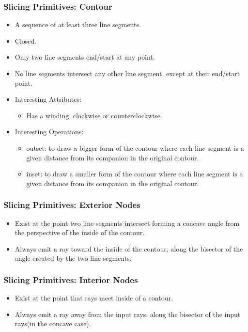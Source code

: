 \documentclass[hyperref={pdfpagemode=FullScreen},aspectratio=169]{beamer}
\begin{document}
\begin{frame}
  \frametitle{Slicing Primitives: Contour}
  \begin{itemize}
  \item A sequence of at least three line segments.
  \item Closed.
  \item Only two line segments end/start at any point.
  \item No line segments intersect any other line segment, except at their end/start point.
  \item Interesting Attributes:
    \begin {itemize}
      \item Has a winding, clockwise or counterclockwise.
    \end{itemize}
  \item Interesting Operations:
    \begin {itemize}
    \item outset: to draw a bigger form of the contour where each line segment is a given distance from its companion in the original contour.
    \item inset: to draw a smaller form of the contour where each line segment is a given distance from its companion in the original contour.
    \end{itemize}
  \end{itemize}
\end{frame}

\begin{frame}
  \frametitle{Slicing Primitives: Exterior Nodes}
  \begin{itemize}
  \item Exist at the point two line segments intersect forming a concave angle from the perspective of the inside of the contour.
  \item Always emit a ray toward the inside of the contour, along the bisector of the angle created by the two line segments.
  \end{itemize}
\end{frame}

\begin{frame}
  \frametitle{Slicing Primitives: Interior Nodes}
  \begin{itemize}
  \item Exist at the point that rays meet inside of a contour.
  \item Always emit a ray away from the input rays, along the bisector of the input rays(in the concave case).
  \end{itemize}
\end{frame}
\end{document}
